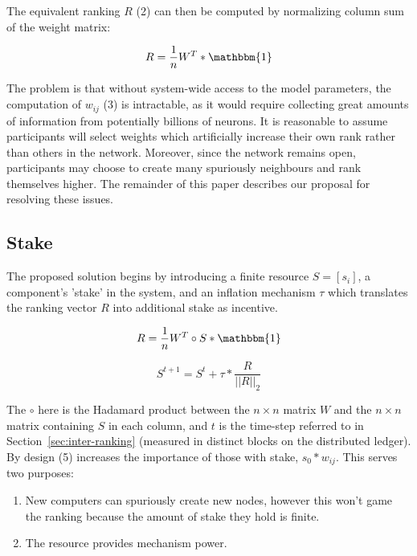 \documentclass{article}
\begin{document}
The equivalent ranking $R$ (2) can then be computed by normalizing column sum of the weight matrix:
\bigskip

\begin{equation}
R = \frac{1}{n} W^T * \mathbbm{1}
\end{equation}

The problem is that without system-wide access to the model parameters, the computation of $w_{ij}$ (3) is intractable, {\color{blue} as it would require collecting great amounts of information from potentially billions of neurons}. It is reasonable to assume participants will select weights which artificially increase their own rank rather than others in the network. Moreover, since the network remains open, participants may choose to create many spuriously neighbours and rank themselves higher. The remainder of this paper describes our proposal for resolving these issues.
\bigskip

\subsection{Stake}
\label{sec:stake}
The proposed solution begins by introducing a finite resource $ S=[s_i]$, a component's 'stake' in the system, and an inflation mechanism $\tau$ which translates the ranking vector $R$ into additional stake as incentive. 
\bigskip

\begin{equation}
R = \frac{1}{n} W^T \circ S * \mathbbm{1}
\end{equation}

\begin{equation}
S^{t+1} = S^t + \tau * \frac{R}{||R||_2} 
\end{equation}

The $\circ$ here is the Hadamard product between the $n \times n$ matrix $W$ and the $n \times n$ matrix containing $S$ in each column, and $t$ is the time-step referred to in Section~\ref{sec:inter-ranking} (measured in distinct blocks on the distributed ledger). By design (5) increases the importance of those with stake, $s_0 * w_{ij}$. This serves two purposes: 

\begin{enumerate}
	\item New computers can spuriously create new nodes, however this won't game the ranking because the amount of stake they hold is finite.
	\item The resource provides mechanism power.
\end{enumerate}
\end{document}
